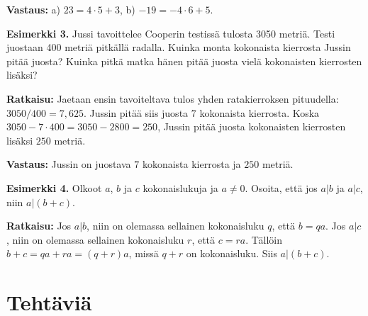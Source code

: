 {\bf Vastaus:} a) $23 = 4\cdot 5 + 3$, b) $-19 = -4\cdot 6 +5$.

{\bf Esimerkki 3.} %
Jussi tavoittelee Cooperin testissä tulosta 3050 metriä. Testi juostaan 400 metriä pitkällä
radalla. Kuinka monta kokonaista kierrosta Jussin pitää juosta? Kuinka pitkä matka
hänen pitää juosta vielä kokonaisten kierrosten lisäksi?

{\bf Ratkaisu:}
Jaetaan ensin tavoiteltava tulos yhden ratakierroksen pituudella:
$3050  / 400  = 7,625$. Jussin pitää siis juosta $7$ kokonaista kierrosta.
Koska $3050  - 7 \cdot 400 = 3050  - 2800  = 250$, Jussin pitää juosta kokonaisten kierrosten lisäksi $250$ metriä.

{\bf Vastaus:} Jussin on juostava $7$ kokonaista kierrosta ja $250$ metriä.

{\bf Esimerkki 4.} Olkoot $a$, $b$ ja $c$ kokonaislukuja ja $a\neq 0$. Osoita, että jos $a|b$ ja $a|c$, niin $a|(b + c)$.

{\bf Ratkaisu:}
Jos $a|b$, niin on olemassa sellainen kokonaisluku $q$, että $b = qa$.
Jos $a|c$, niin on olemassa sellainen kokonaisluku $r$, että $c = ra$.
Tällöin $b + c = qa + ra = (q + r)a$, missä $q + r$ on kokonaisluku. 
Siis $a|(b + c)$.


\newpage


\section*{Tehtäviä}

